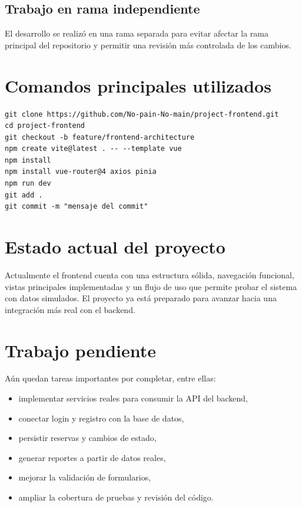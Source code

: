 \documentclass[12pt]{article}
\begin{document}
\subsection{Trabajo en rama independiente}

El desarrollo se realizó en una rama separada para evitar afectar la rama principal del repositorio y permitir una revisión más controlada de los cambios.

\section{Comandos principales utilizados}

\begin{verbatim}
git clone https://github.com/No-pain-No-main/project-frontend.git
cd project-frontend
git checkout -b feature/frontend-architecture
npm create vite@latest . -- --template vue
npm install
npm install vue-router@4 axios pinia
npm run dev
git add .
git commit -m "mensaje del commit"
\end{verbatim}

\section{Estado actual del proyecto}

Actualmente el frontend cuenta con una estructura sólida, navegación funcional, vistas principales implementadas y un flujo de uso que permite probar el sistema con datos simulados. El proyecto ya está preparado para avanzar hacia una integración más real con el backend.

\section{Trabajo pendiente}

Aún quedan tareas importantes por completar, entre ellas:

\begin{itemize}
    \item implementar servicios reales para consumir la API del backend,
    \item conectar login y registro con la base de datos,
    \item persistir reservas y cambios de estado,
    \item generar reportes a partir de datos reales,
    \item mejorar la validación de formularios,
    \item ampliar la cobertura de pruebas y revisión del código.
\end{itemize}
\end{document}
